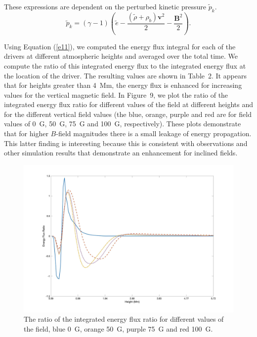 \documentclass[physics,article,submit,pdftex,moreauthors]{Definitions/mdpi}
\begin{document}
These expressions are dependent on the perturbed kinetic pressure $\tilde{p}_{k}$.
$$
\tilde{p}_{k}=\left(\gamma - 1\right)\left( \tilde{e}-\frac{ \left( \tilde{\rho} +\rho_b \right){\mathbf v}^2}{2}-\frac{{\mathbf B}^2}{2}\right).
$$


Using Equation (\ref{e11}), we computed the energy flux integral for each of the drivers at different atmospheric heights and averaged over the total time. We compute the ratio of this integrated energy flux to the integrated energy flux at the location of the driver. The resulting values are shown in Table~2. It appears that for heights greater than 4~Mm, the energy flux is enhanced for increasing values for the vertical magnetic field. In Figure~9,
we plot the ratio of the integrated energy flux ratio for different values of the field at different heights and for the different vertical field values (the blue, orange, purple and red  are for field values of 0~G, 50~G, 75~G and 100~G, respectively). These plots demonstrate that for higher $B$-field magnitudes there is a small leakage of energy propagation. This latter finding is interesting because this is consistent with observations and other simulation results that demonstrate an enhancement for inclined fields.


\begin{figure}
    \label{energyfluxratio_50G_75G_100G_line}
    \centering
    \includegraphics[scale=0.06]{energyfluxratio.jpg}
    \caption{The ratio of the integrated energy flux ratio for different values of the field, blue 0~G, orange 50~G, purple 75~G and red 100~G.}
\end{figure}
\end{document}
